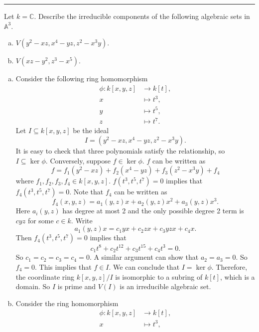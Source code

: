 \documentclass[letterpaper, 12pt]{article}
\begin{document}
\noindent\rule{7in}{2.8pt}
\begin{problem}{6}
Let \(k=\mathbb{C}\). Describe the irreducible components of the following algebraic sets in \(\mathbb{A}^3\). 
\begin{enumerate}[(a)]
\item \(V(y^2-xz,x^4-yz,z^2-x^3y)\).
\item \(V(xz-y^2,z^3-x^5)\).
\end{enumerate}
\end{problem}
\begin{solution}
\begin{enumerate}[(a)]
\item Consider the following ring homomorphism 
\begin{align*}
    \phi:k[x,y,z]&\rightarrow k[t],\\ 
         x&\mapsto t^3,\\
         y&\mapsto t^5,\\ 
         z&\mapsto t^7. 
\end{align*}
Let \(I\subseteq k[x,y,z]\) be the ideal 
\[I=(y^2-xz,x^4-yz,z^2-x^3y).\]
It is easy to check that three polynomials satisfy the relationship, so \(I\subseteq \ker \phi\). Conversely, suppose \(f\in \ker \phi\). \(f\) can be written as 
\[f=f_1(y^2-xz)+f_2(x^4-yz)+f_3(z^2-x^3y)+f_4\]
where \(f_1,f_2,f_3,f_4\in k[x,y,z]\). \(f(t^3,t^5,t^7)=0\) implies that \(f_4(t^3,t^5,t^7)=0\). Note that \(f_4\) can be written as 
\[f_4(x,y,z)=a_1(y,z)x+a_2(y,z)x^2+a_3(y,z)x^3.\]
Here \(a_i(y,z)\) has degree at most 2 and the only possible degree 2 term is \(cyz\) for some \(c\in k\). Write 
\[a_1(y,z)x=c_1yx+c_2zx+c_3yzx+c_4x.\]
Then \(f_4(t^3,t^5,t^7)=0\) implies that 
\[c_1 t^8+c_2 t^{12}+c_3t^{15}+c_4t^3=0.\]
So \(c_1=c_2=c_3=c_4=0\). A similar argument can show that \(a_2=a_3=0\). So \(f_4=0\). This implies that \(f\in I\). We can conclude that \(I=\ker\phi\). Therefore, the coordinate ring \(k[x,y,z]/I\) is isomorphic to a subring of \(k[t]\), which is a domain. So \(I\) is prime and \(V(I)\) is an irreducible algebraic set.
\item Consider the ring homomorphism
\begin{align*}
    \phi:k[x,y,z]&\rightarrow k[t],\\ 
         x&\mapsto t^3,\\ 

\end{align*}
\end{enumerate}
\end{solution}
\end{document}
